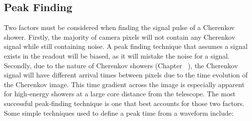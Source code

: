 \subsection{Peak Finding} \label{peakfinding}

Two factors must be considered when finding the signal pulse of a Cherenkov shower. Firstly, the majority of camera pixels will not contain any Cherenkov signal while still containing noise. A peak finding technique that assumes a signal exists in the readout will be biased, as it will mistake the noise for a signal. Secondly, due to the nature of Cherenkov showers (Chapter~ ), the Cherenkov signal will have different arrival times between pixels due to the time evolution of the Cherenkov image. This time gradient across the image is especially apparent for high-energy showers at a large core distance from the telescope. The most successful peak-finding technique is one that best accounts for those two factors. Some simple techniques used to define a peak time from a waveform include:
